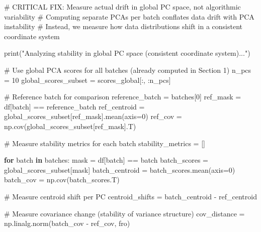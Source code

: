 \documentclass[
  letterpaper,
  DIV=11,
  numbers=noendperiod]{scrartcl}
\newenvironment{Shaded}{\begin{snugshade}}{\end{snugshade}}
\newcommand{\BuiltInTok}[1]{\textcolor[rgb]{0.00,0.23,0.31}{#1}}
\newcommand{\CommentTok}[1]{\textcolor[rgb]{0.37,0.37,0.37}{#1}}
\newcommand{\ControlFlowTok}[1]{\textcolor[rgb]{0.00,0.23,0.31}{\textbf{#1}}}
\newcommand{\DecValTok}[1]{\textcolor[rgb]{0.68,0.00,0.00}{#1}}
\newcommand{\KeywordTok}[1]{\textcolor[rgb]{0.00,0.23,0.31}{\textbf{#1}}}
\newcommand{\NormalTok}[1]{\textcolor[rgb]{0.00,0.23,0.31}{#1}}
\newcommand{\OperatorTok}[1]{\textcolor[rgb]{0.37,0.37,0.37}{#1}}
\newcommand{\StringTok}[1]{\textcolor[rgb]{0.13,0.47,0.30}{#1}}
\renewenvironment{Shaded}{%
  \begin{tcolorbox}[%
    enhanced,%
    colback=codebg,%
    colframe=codebg,%
    borderline west={3pt}{0pt}{sectionblue},%
    fontupper=\small\ttfamily,%
    boxrule=0pt,%
    arc=0pt,%
    boxsep=5pt,%
    left=2mm,%
    right=2mm,%
    top=2mm,%
    bottom=2mm%
  ]%
}{%
  \end{tcolorbox}%
}
\begin{document}
\begin{Shaded}
\begin{Highlighting}[]
\CommentTok{\# CRITICAL FIX: Measure actual drift in global PC space, not algorithmic variability}
\CommentTok{\# Computing separate PCAs per batch conflates data drift with PCA instability}
\CommentTok{\# Instead, we measure how data distributions shift in a consistent coordinate system}

\BuiltInTok{print}\NormalTok{(}\StringTok{"Analyzing stability in global PC space (consistent coordinate system)..."}\NormalTok{)}

\CommentTok{\# Use global PCA scores for all batches (already computed in Section 1)}
\NormalTok{n\_pcs }\OperatorTok{=} \DecValTok{10}
\NormalTok{global\_scores\_subset }\OperatorTok{=}\NormalTok{ scores\_global[:, :n\_pcs]}

\CommentTok{\# Reference batch for comparison}
\NormalTok{reference\_batch }\OperatorTok{=}\NormalTok{ batches[}\DecValTok{0}\NormalTok{]}
\NormalTok{ref\_mask }\OperatorTok{=}\NormalTok{ df[}\StringTok{\textquotesingle{}batch\textquotesingle{}}\NormalTok{] }\OperatorTok{==}\NormalTok{ reference\_batch}
\NormalTok{ref\_centroid }\OperatorTok{=}\NormalTok{ global\_scores\_subset[ref\_mask].mean(axis}\OperatorTok{=}\DecValTok{0}\NormalTok{)}
\NormalTok{ref\_cov }\OperatorTok{=}\NormalTok{ np.cov(global\_scores\_subset[ref\_mask].T)}

\CommentTok{\# Measure stability metrics for each batch}
\NormalTok{stability\_metrics }\OperatorTok{=}\NormalTok{ []}

\ControlFlowTok{for}\NormalTok{ batch }\KeywordTok{in}\NormalTok{ batches:}
\NormalTok{    mask }\OperatorTok{=}\NormalTok{ df[}\StringTok{\textquotesingle{}batch\textquotesingle{}}\NormalTok{] }\OperatorTok{==}\NormalTok{ batch}
\NormalTok{    batch\_scores }\OperatorTok{=}\NormalTok{ global\_scores\_subset[mask]}
\NormalTok{    batch\_centroid }\OperatorTok{=}\NormalTok{ batch\_scores.mean(axis}\OperatorTok{=}\DecValTok{0}\NormalTok{)}
\NormalTok{    batch\_cov }\OperatorTok{=}\NormalTok{ np.cov(batch\_scores.T)}
    
    \CommentTok{\# Measure centroid shift per PC}
\NormalTok{    centroid\_shifts }\OperatorTok{=}\NormalTok{ batch\_centroid }\OperatorTok{{-}}\NormalTok{ ref\_centroid}
    
    \CommentTok{\# Measure covariance change (stability of variance structure)}
\NormalTok{    cov\_distance }\OperatorTok{=}\NormalTok{ np.linalg.norm(batch\_cov }\OperatorTok{{-}}\NormalTok{ ref\_cov, }\StringTok{\textquotesingle{}fro\textquotesingle{}}\NormalTok{)}
    

\end{Highlighting}
\end{Shaded}
\end{document}
